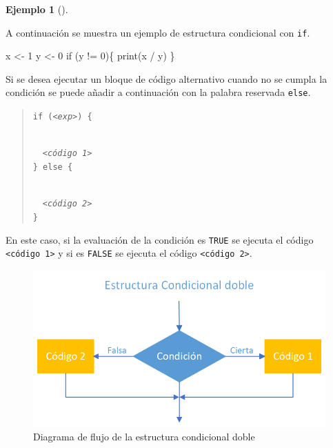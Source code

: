\documentclass[
  a4paper,
]{scrreport}
\newenvironment{Shaded}{\begin{snugshade}}{\end{snugshade}}
\newcommand{\ControlFlowTok}[1]{\textcolor[rgb]{0.00,0.23,0.31}{#1}}
\newcommand{\DecValTok}[1]{\textcolor[rgb]{0.68,0.00,0.00}{#1}}
\newcommand{\FunctionTok}[1]{\textcolor[rgb]{0.28,0.35,0.67}{#1}}
\newcommand{\NormalTok}[1]{\textcolor[rgb]{0.00,0.23,0.31}{#1}}
\newcommand{\OtherTok}[1]{\textcolor[rgb]{0.00,0.23,0.31}{#1}}
\newcommand{\SpecialCharTok}[1]{\textcolor[rgb]{0.37,0.37,0.37}{#1}}
\theoremstyle{definition}
\newtheorem{example}{Ejemplo}[chapter]
\theoremstyle{definition}
\theoremstyle{remark}
\begin{document}
\leavevmode{}%
\begin{example}[]\label{exm-condicional-simple}

A continuación se muestra un ejemplo de estructura condicional con
\texttt{if}.

\begin{Shaded}
\begin{Highlighting}[]
\NormalTok{x }\OtherTok{\textless{}{-}} \DecValTok{1}
\NormalTok{y }\OtherTok{\textless{}{-}} \DecValTok{0}
\ControlFlowTok{if}\NormalTok{ (y }\SpecialCharTok{!=} \DecValTok{0}\NormalTok{)\{}
  \FunctionTok{print}\NormalTok{(x }\SpecialCharTok{/}\NormalTok{ y)}
\NormalTok{\}}
\end{Highlighting}
\end{Shaded}

\end{example}

Si se desea ejecutar un bloque de código alternativo cuando no se cumpla
la condición se puede añadir a continuación con la palabra reservada
\texttt{else}.

\begin{quote}
\texttt{if\ (}\emph{\texttt{\textless{}exp\textgreater{}}}\texttt{)\ \{}\strut \\
  \emph{\texttt{\textless{}código\ 1\textgreater{}}}\\
\texttt{\}\ else\ \{}\strut \\
  \emph{\texttt{\textless{}código\ 2\textgreater{}}}\\
\texttt{\}}
\end{quote}

En este caso, si la evaluación de la condición es \texttt{TRUE} se
ejecuta el código \texttt{\textless{}código\ 1\textgreater{}} y si es
\texttt{FALSE} se ejecuta el código
\texttt{\textless{}código\ 2\textgreater{}}.

\begin{figure}

{\centering \includegraphics{./img/04-estructuras-control/condicional-doble.png}

}

\caption{Diagrama de flujo de la estructura condicional doble}

\end{figure}
\end{document}
